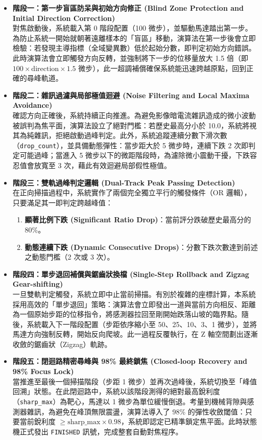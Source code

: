 \begin{itemize}
    \item \textbf{階段一：第一步盲區防呆與初始方向修正 (Blind Zone Protection and Initial Direction Correction)} \\
    對焦啟動後，系統載入第 0 階段配置（100 微步），並驅動馬達踏出第一步。為防止系統一開始就朝著遠離樣本的「盲區」移動，演算法在第一步後會立即檢驗：若發現主導指標（全域變異數）低於起始分數，即判定初始方向錯誤。此時演算法會立即觸發方向反轉，並強制將下一步的位移量放大 1.5 倍（即 $100 \times \text{direction} \times 1.5$ 微步），此一超調補償確保系統能迅速跨越原點，回到正確的尋峰軌道。

    \item \textbf{階段二：雜訊過濾與局部極值迴避 (Noise Filtering and Local Maxima Avoidance)} \\
    確認方向正確後，系統持續正向推進。為避免影像暗電流雜訊造成的微小波動被誤判為焦平面，演算法設立了絕對門檻：若歷史最高分小於 10.0，系統將視其為純雜訊，拒絕啟動過峰判定。此外，系統追蹤連續分數下滑次數（\texttt{drop\_count}），並具備動態彈性：當步距大於 5 微步時，連續下跌 2 次即判定可能過峰；當進入 5 微步以下的微距階段時，為濾除微小震動干擾，下跌容忍值會放寬至 3 次，藉此有效迴避局部假性極值。

    \item \textbf{階段三：雙軌過峰判定邏輯 (Dual-Track Peak Passing Detection)} \\
    在正向掃描過程中，系統實作了兩個完全獨立平行的觸發條件（OR 邏輯），只要滿足其一即判定跨越峰值：
    \begin{enumerate}
        \item \textbf{顯著比例下跌 (Significant Ratio Drop)}：當前評分跌破歷史最高分的 80\%。
        \item \textbf{動態連續下跌 (Dynamic Consecutive Drops)}：分數下跌次數達到前述之動態門檻（2 次或 3 次）。
    \end{enumerate}

    \item \textbf{階段四：單步退回補償與鋸齒狀換檔 (Single-Step Rollback and Zigzag Gear-shifting)} \\
    一旦雙軌判定觸發，系統立即中止當前掃描。有別於複雜的座標計算，本系統採用高效的「單步退回」策略：演算法會立即發出一道與當前方向相反、距離為一個原始步距的位移指令，將感測器拉回至剛開始跌落山坡的臨界點。隨後，系統載入下一階段配置（步距依序縮小至 50、25、10、3、1 微步），並將馬達方向強制反轉，開始反向爬坡。此一過程反覆執行，在 Z 軸空間劃出逐漸收斂的鋸齒狀（Zigzag）軌跡。

    \item \textbf{階段五：閉迴路精密尋峰與 98\% 最終鎖焦 (Closed-loop Recovery and 98\% Focus Lock)} \\
    當推進至最後一個掃描階段（步距 1 微步）並再次過峰後，系統切換至「峰值回溯」狀態。在此閉迴路中，系統以該階段測得的絕對最高銳利度（\texttt{sharp\_max}）為靶心，馬達以 1 微步為單位緩慢倒退。考量到機械背隙與感測器雜訊，為避免在峰頂無限震盪，演算法導入了 98\% 的彈性收斂閾值：只要當前銳利度 $\ge \text{sharp\_max} \times 0.98$，系統即認定已精準鎖定焦平面。此時狀態機正式發出 \texttt{FINISHED} 訊號，完成整套自動對焦程序。
\end{itemize}

